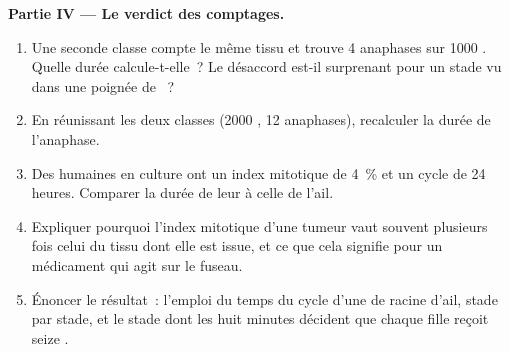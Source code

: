 \begin{problem}
\medskip
\noindent\textbf{Partie IV --- Le verdict des comptages.}
\begin{enumerate}[resume]
  \item Une seconde classe compte le même tissu et trouve 4 anaphases
        sur 1000 . Quelle durée calcule-t-elle~? Le désaccord
        est-il surprenant pour un stade vu dans une poignée de
        ~?
  \item En réunissant les deux classes (2000 , 12 anaphases),
        recalculer la durée de l'anaphase.
  \item Des  humaines en culture ont un index mitotique de
        4~\% et un cycle de 24 heures. Comparer la durée de leur 
        à celle de l'ail.
  \item Expliquer pourquoi l'index mitotique d'une tumeur vaut souvent
        plusieurs fois celui du tissu dont elle est issue, et ce que
        cela signifie pour un médicament qui agit sur le fuseau.
  \item Énoncer le résultat~: l'emploi du temps du cycle d'une 
        de racine d'ail, stade par stade, et le stade dont les huit
        minutes décident que chaque fille reçoit seize .
\end{enumerate}
\end{problem}

